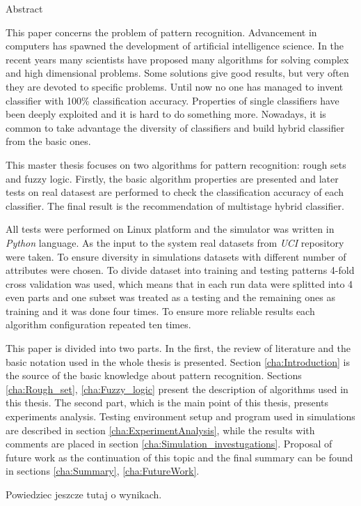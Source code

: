 \thispagestyle{empty}
\begin{center}
	Abstract
\end{center}
This paper concerns the problem of pattern recognition. Advancement in
computers has spawned the development of artificial intelligence science. In the
recent years many scientists have proposed many algorithms for solving complex
and high dimensional problems. Some solutions give good results, but very
often they are devoted to specific problems. Until now no one has managed to
invent classifier with 100\% classification accuracy. Properties of single
classifiers have been deeply exploited and it is hard to do something more.
Nowadays, it is common to take advantage the diversity of classifiers and build 
hybrid classifier from the basic ones.

This master thesis focuses on two algorithms for pattern recognition: rough
sets and fuzzy logic. Firstly, the basic algorithm properties are presented and
later tests on real datasest are performed to check the classification accuracy
of each classifier. The final result is the recommendation of multistage hybrid
classifier.

All tests were performed on Linux platform and the simulator was written in
\textit{Python} language. As the input to the system real datasets from
\textit{UCI} repository were taken. To ensure diversity in simulations datasets
with different number of attributes were chosen. To divide dataset into
training and testing patterns 4-fold cross validation was used, which means
that in each run data were splitted into 4 even parts and one subset was
treated as a testing and the remaining ones as training and it was done four
times. To ensure more reliable results each algorithm configuration repeated
ten times.

This paper is divided into two parts.  In the first, the review of
literature and the basic notation used in the whole thesis is presented. Section
\ref{cha:Introduction} is the source of the basic
knowledge about pattern recognition. Sections \ref{cha:Rough_set}, \ref{cha:Fuzzy_logic}
present the description of algorithms used in this thesis. The second part,
which is the main point of this thesis, presents experiments analysis. Testing
environment setup and program used in simulations are described in section
\ref{cha:ExperimentAnalysis}, while the results with comments are placed in
section \ref{cha:Simulation_investugations}. Proposal of future work as the 
continuation of this topic and the final summary can be found in
sections \ref{cha:Summary}, \ref{cha:FutureWork}.

Powiedziec jeszcze tutaj o wynikach.


